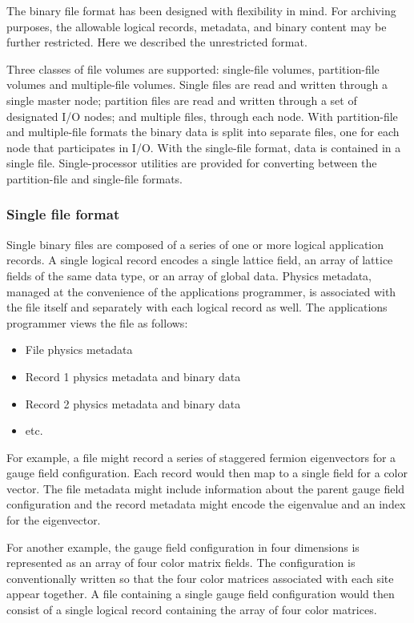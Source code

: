 \documentclass{article}
\begin{document}
The binary file format has been designed with flexibility in mind. For
archiving purposes, the allowable logical records, metadata, and
binary content may be further restricted.  Here we described the
unrestricted format.

Three classes of file volumes are supported: single-file volumes,
partition-file volumes and multiple-file volumes.  Single files are
read and written through a single master node; partition files are
read and written through a set of designated I/O nodes; and multiple
files, through each node.  With partition-file and multiple-file
formats the binary data is split into separate files, one for each
node that participates in I/O.  With the single-file format, data is
contained in a single file.  Single-processor utilities are provided
for converting between the partition-file and single-file formats.

\subsubsection{Single file format}

Single binary files are composed of a series of one or more logical
application records.  A single logical record encodes a single lattice
field, an array of lattice fields of the same data type, or an array
of global data.  Physics metadata, managed at the convenience of the
applications programmer, is associated with the file itself and
separately with each logical record as well. The applications
programmer views the file as follows:
%
\begin{itemize}
  \item File physics metadata
  \item Record 1 physics metadata and binary data
  \item Record 2 physics metadata and binary data
  \item etc.
\end{itemize}
%
For example, a file might record a series of staggered fermion
eigenvectors for a gauge field configuration.  Each record would then
map to a single field for a color vector.  The file metadata might
include information about the parent gauge field configuration and the
record metadata might encode the eigenvalue and an index for the
eigenvector.

For another example, the gauge field configuration in four dimensions
is represented as an array of four color matrix fields.  The
configuration is conventionally written so that the four color
matrices associated with each site appear together.  A file containing
a single gauge field configuration would then consist of a single
logical record containing the array of four color matrices.
\end{document}
